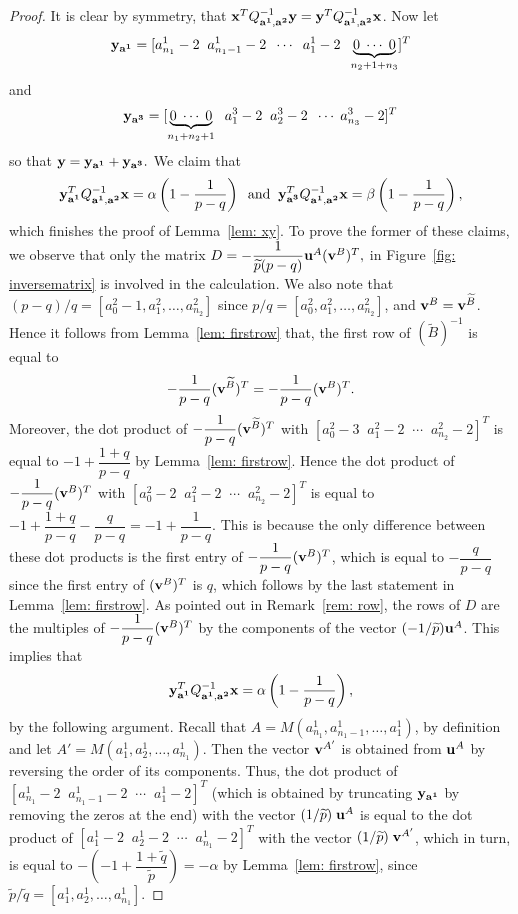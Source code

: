 \documentclass[11pt]{amsart}
\theoremstyle{plain}
\theoremstyle{definition}
\theoremstyle{remark}
\numberwithin{theorem}{section}
\begin{document}
\begin{proof} It is clear by symmetry,  that ${\bf x}^T Q^{-1}_{{\bf a^1}, {\bf a^2}} {\bf y} = {\bf y}^T Q^{-1}_{{\bf a^1}, {\bf a^2}} {\bf x}$.   
Now let 
\[
{\bf y_{a^1}}=[a^1_{n_1}-2 \;\; a^1_{n_1-1}-2 \;\; \cdots \;\; a^1_1-2 \;\;   \underbrace{0 \; \cdots \; 0}_{n_2+1+n_3}]^T
\] 
and 
\[
{\bf y_{a^3}}=[ \underbrace{0 \; \cdots \; 0}_{n_1+n_2+1} \;\; a^3_1-2 \; \; a^3_2-2 \; \;  \cdots \; a^3_{n_3}-2]^T
\] 
so that $ {\bf y} = {\bf y_{a^1}} + {\bf y_{a^3}}.$ We claim that 
\[
{\bf y}^T_{\bf a^1} Q^{-1}_{{\bf a^1}, {\bf a^2}} {\bf x}= \alpha \left(1 - \dfrac{1}{p-q}\right)\;\; 
\mbox{and}\;\; {\bf y}^T_{\bf a^3} Q^{-1}_{{\bf a^1}, {\bf a^2}} {\bf x}= \beta \left(1 - \dfrac{1}{p-q}\right),
\] 
which finishes the proof of Lemma~\ref{lem: xy}. To prove the former of these claims, we observe that only the matrix $D= -\dfrac{1}{\widetilde{p} (p-q)}   {\bf u}^A ({\bf v}^B)^T,$ in Figure~\ref{fig: inversematrix} is involved in the calculation. We also note that $(p-q)/q= [a^2_0-1, a^2_1, \ldots, a^2_{n_2}]$ since $p/q= [a^2_0, a^2_1, \ldots, a^2_{n_2}]$, and ${\bf v}^B = {\bf v}^{\widetilde{B}}$. Hence it follows from Lemma~\ref{lem: firstrow} that,  the first row of $(\widetilde{B})^{-1}$ is equal to 
\[ 
-\dfrac{1}{p-q} ({\bf v}^{\widetilde{B}})^T= -\dfrac{1}{p-q} ({\bf v}^B)^T .
\]
Moreover,  the dot product of  $-\dfrac{1}{p-q} ({\bf v}^{\widetilde{B}})^T$ with  $[a^2_0-3 \;\; a^2_1-2 \; \; \cdots \;\; a^2_{n_2}-2]^T$ is equal to $-1+\dfrac{1+q}{p-q}$ by Lemma~\ref{lem: firstrow}. Hence the dot product of  $-\dfrac{1}{p-q} ({\bf v}^B)^T$ with $[a^2_0-2 \;\; a^2_1-2 \; \; \cdots \;\; a^2_{n_2}-2]^T$ is equal to $-1+\dfrac{1+q}{p-q} -\dfrac{q}{p-q}= -1 + \dfrac{1}{p-q}$. This is because the only difference between these dot products is the first entry of $-\dfrac{1}{p-q} ({\bf v}^B)^T$, which is equal to $-\dfrac{q}{p-q}$ since the first entry of $({\bf v}^B)^T$ is $q$, which follows by the last statement in Lemma~\ref{lem: firstrow}. As pointed out in Remark~\ref{rem: row}, the rows of $D$ are the multiples of  $-\dfrac{1}{p-q} ({\bf v}^B)^T$ by the components of the vector  $(-1/\widetilde{p}) {\bf u}^A $. This implies that 
\[
{\bf y}^T_{\bf a^1} Q^{-1}_{{\bf a^1}, {\bf a^2}} {\bf x}= \alpha \left(1 - \dfrac{1}{p-q}\right),
\] 
by the following argument.  Recall that $A=M(a^1_{n_1}, a^1_{n_1-1}, \ldots, a^1_1)$, by definition and let $A'=  M (a^1_1, a^1_2, \ldots, a^1_{n_1})$.  Then the vector ${\bf v}^{A'}$ is obtained from ${\bf u}^{A}$ by reversing the order of its components. Thus, the dot product of $[a^1_{n_1}-2 \;\; a^1_{n_1-1}-2 \;\; \cdots \;\; a^1_1-2]^T$ (which is obtained by truncating ${\bf y}_{\bf a^1}$ by removing the zeros at the end) with the vector $(1/ \widetilde{p})  \; {\bf u}^A $ is equal to the dot product of $[a^1_1-2 \;\; a^1_{2}-2 \;\; \cdots \;\; a^1_{n_1}-2]^T$ with the vector $(1/ \widetilde{p})  \; {\bf v}^{A'}$, which in turn, is equal to  $-\left(-1 + \dfrac{1+\widetilde{q}}{\widetilde{p}}\right)=-\alpha$ by Lemma~\ref{lem: firstrow}, since $\widetilde{p}/\widetilde{q}=[a^1_1, a^1_2,  \ldots, a^1_{n_1}]$.  


\end{proof}
\end{document}
